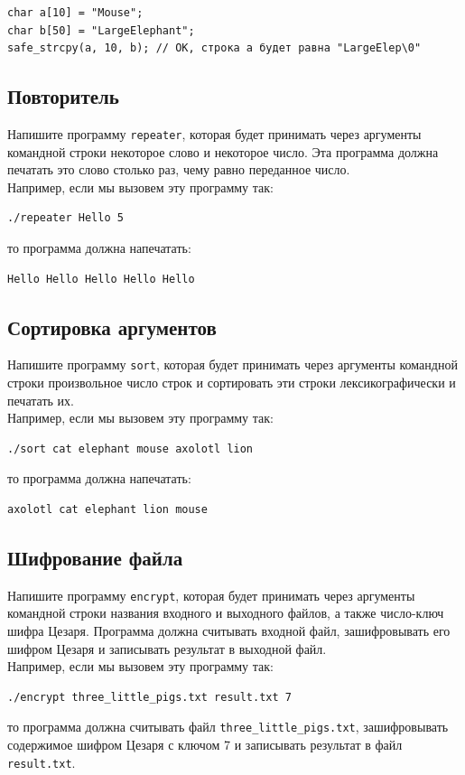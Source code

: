 \documentclass{article}
\begin{document}
\begin{lstlisting}
char a[10] = "Mouse";
char b[50] = "LargeElephant";
safe_strcpy(a, 10, b); // OK, строка a будет равна "LargeElep\0"
\end{lstlisting}



\subsection{Повторитель}
Напишите программу \texttt{repeater}, которая будет принимать через аргументы командной строки некоторое слово и некоторое число. Эта программа должна печатать это слово столько раз, чему равно переданное число.\\
Например, если мы вызовем эту программу так:
\begin{verbatim}
./repeater Hello 5
\end{verbatim}
то программа должна напечатать:
\begin{verbatim}
Hello Hello Hello Hello Hello
\end{verbatim}


\subsection{Сортировка аргументов}
Напишите программу \texttt{sort}, которая будет принимать через аргументы командной строки произвольное число строк и сортировать эти строки лексикографически и печатать их.\\
Например, если мы вызовем эту программу так:
\begin{verbatim}
./sort cat elephant mouse axolotl lion
\end{verbatim}
то программа должна напечатать:
\begin{verbatim}
axolotl cat elephant lion mouse
\end{verbatim}


\subsection{Шифрование файла}
Напишите программу \texttt{encrypt}, которая будет принимать через аргументы командной строки названия входного и выходного файлов, а также число-ключ шифра Цезаря. Программа должна считывать входной файл, зашифровывать его шифром Цезаря и записывать результат в выходной файл.\\
Например, если мы вызовем эту программу так:
\begin{verbatim}
./encrypt three_little_pigs.txt result.txt 7
\end{verbatim}
то программа должна считывать файл \texttt{three\_little\_pigs.txt}, зашифровывать содержимое шифром Цезаря с ключом 7 и записывать результат в файл \texttt{result.txt}.
\end{document}
